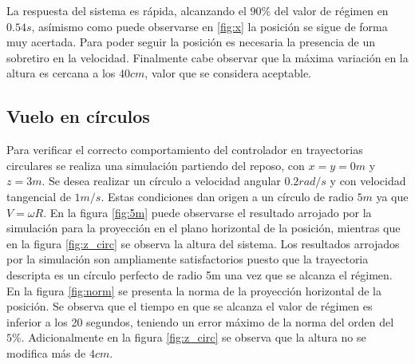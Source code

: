 \documentclass[main]{subfiles}
\begin{document}
La respuesta del sistema es r\'apida, alcanzando el $90\%$ del valor de r\'egimen en $0.54s$, as\'imismo como puede observarse en \ref{fig:x} la posici\'on se sigue de forma muy acertada.  Para poder seguir la posici\'on es necesaria la presencia de un sobretiro en la velocidad. Finalmente cabe observar que la m\'axima variaci\'on en la altura es cercana a los $40cm$, valor que se considera aceptable.

%
%

\subsection{Vuelo en c\'irculos}
Para verificar el correcto comportamiento del controlador en trayectorias circulares se realiza una simulaci\'on partiendo del reposo, con $x =y = 0m$ y $z=3m$. Se desea realizar un c\'irculo a velocidad angular $0.2rad/s$ y con velocidad tangencial de $1m/s$. Estas condiciones dan origen a un c\'irculo de radio $5m$ ya que $V = \omega R$. En la figura \ref{fig:5m} puede observarse el resultado arrojado por la simulaci\'on para la proyecci\'on en el plano horizontal de la posici\'on, mientras que en la figura \ref{fig:z_circ} se observa la altura del sistema. Los resultados arrojados por la simulaci\'on son ampliamente satisfactorios puesto que la trayectoria descripta es un c\'irculo perfecto de radio 5m una vez que se alcanza el r\'egimen. En la figura \ref{fig:norm} se presenta la norma de la proyecci\'on horizontal de la posici\'on. Se observa que el tiempo en que se alcanza el valor de r\'egimen es inferior a los 20 segundos, teniendo un error m\'aximo de la norma del orden del $5\%$. Adicionalmente en la figura \ref{fig:z_circ} se observa que la altura no se modifica m\'as de $4cm$.\\
 
\end{document}
